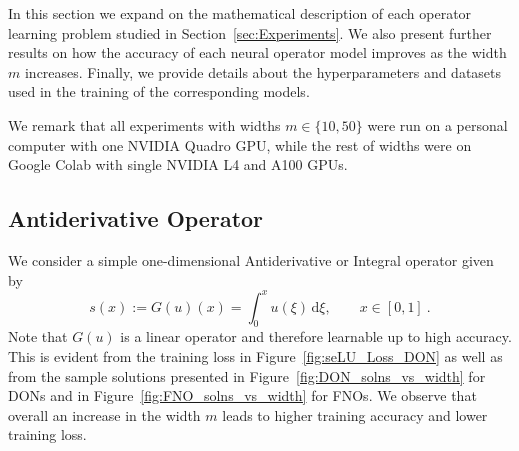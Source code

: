 In this section we expand on the mathematical description of each operator learning problem studied in Section~\ref{sec:Experiments}. We also present further results on how the accuracy of each neural operator model improves as the width $m$ increases. Finally, we provide details about the hyperparameters and datasets used in the training of the corresponding models. 

We remark that all experiments with widths $m\in\{10,50\}$ were run on a personal computer with one NVIDIA Quadro GPU, while the rest of widths were on Google Colab with single NVIDIA L4 and A100 GPUs. 

\subsection{Antiderivative Operator}
We consider a simple one-dimensional Antiderivative or Integral operator given by
\begin{equation}
    s(x) := G(u)(x) = \int_0^x u(\xi)\,\mathrm{d}\xi, \qquad x\in [0, 1]~.
\end{equation}
Note that $G(u)$ is a linear operator and therefore learnable up to high accuracy. This is evident from the training loss in Figure~\ref{fig:seLU_Loss_DON} as well as from the sample solutions presented in Figure~\ref{fig:DON_solns_vs_width} for DONs and in Figure~\ref{fig:FNO_solns_vs_width} for FNOs. We observe that overall an increase in the width $m$ leads to higher training accuracy and lower training loss.

